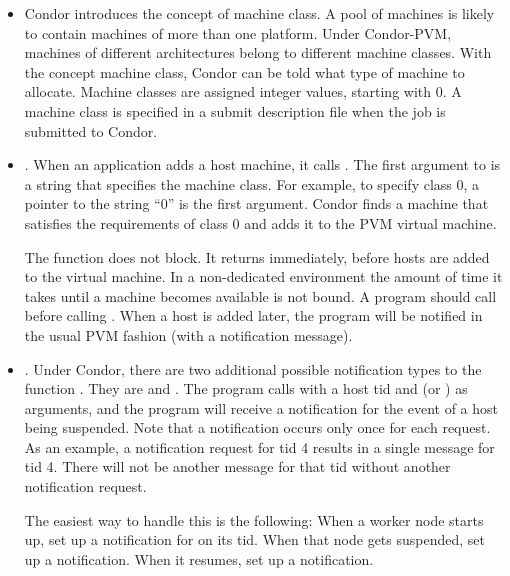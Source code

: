 \begin{itemize}

\item Condor introduces the concept of machine class.
  A pool of machines is likely to contain machines of more than
  one platform.
  Under Condor-PVM, machines of
  different architectures belong to different machine classes.
  With the concept machine class,
  Condor can be told what type
  of machine to allocate.
  Machine classes are assigned integer values, starting with 0.
  A machine class is
  specified in a submit description file when the job
  is submitted to Condor.

\item {}.  When an application
  adds a host machine, it calls .
  The first argument to 
  is a string that specifies the machine class.
  For example, to specify class 0, a pointer to the string ``0''
  is the first argument.  Condor finds a machine
  that satisfies the requirements of class 0 and adds it to the PVM
  virtual machine.

  The function  does not block.  It
  returns immediately, before hosts are added to the virtual
  machine.  
  In a non-dedicated environment the amount of time it takes until
  a machine becomes available is not bound.
  A program should call 
   before calling
  . When a host is added later, the program
  will be notified in the usual PVM 
  fashion (with a  notification message).
    

\item {}.  Under Condor, there are two additional 
  possible notification types
  to the function .
  They are  and
  .
  The program calls 
  with a host tid and  (or )
  as arguments, and the program will receive
  a notification for the event of a host being suspended.
  Note that a notification occurs only once for each request.
  As an example,
  a  
  notification request for tid 4 results in a single 
  message for tid 4. 
  There will not be another  message for
  that tid without another notification request.

  The easiest way to handle this is the following:  When a worker
  node starts up, set up a notification for  on
  its tid.  When that node gets suspended, set up a 
  notification.  When it resumes, set up a 
  notification.



\end{itemize}
